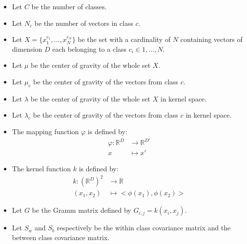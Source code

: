 
\begin{itemize}
  \item Let $C$ be the number of classes.
  \item Let $N_c$ be the number of vectors in class $c$.
  \item Let $X = \{x^{c_1}_1, \ldots, x^{c_N}_N\}$ be the set with a cardinality of $N$ containing
  vectors of dimension $D$ each belonging to a class $c_i \in {1, ..., N}$.
  \item Let $\mu$ be the center of gravity of the whole set $X$.
  \item Let $\mu_c$ be the center of gravity of the vectors from class $c$.
  \item Let $\lambda$ be the center of gravity of the whole set $X$ in kernel space.
  \item Let $\lambda_c$ be the center of gravity of the vectors from class $c$ in kernel space.
  \item The mapping function $\varphi$ is defined by:
  \begin{align*}
      \varphi : \mathbb{R}^D &\to \mathbb{R}^{D'}\\
      x &\mapsto x'
      \end{align*}
      \item The kernel function $k$ is defined by:
      \begin{align*}
k : \left(\mathbb{R}^D\right)^2 &\to \mathbb{R}\\
      (x_1, x_2) &\mapsto <\phi(x_1), \phi(x_2)>
      \end{align*}
  \item Let $G$ be the Gramm matrix defined by $G_{i,j} = k(x_i, x_j)$.
  \item Let $S_w$ and $S_b$ respectively be the within class covariance matrix and the between class covariance matrix. 
\end{itemize}
